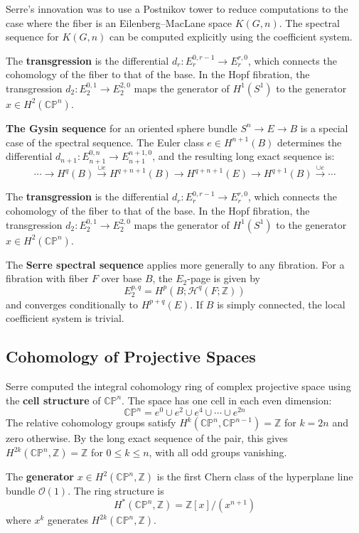 Serre's innovation was to use a Postnikov tower to reduce computations to the case where the fiber is an Eilenberg--MacLane space $K(G, n)$. The spectral sequence for $K(G, n)$ can be computed explicitly using the coefficient system.

The \textbf{transgression} is the differential $d_r: E_r^{0,r-1} \to E_r^{r,0}$, which connects the cohomology of the fiber to that of the base. In the Hopf fibration, the transgression $d_2: E_2^{0,1} \to E_2^{2,0}$ maps the generator of $H^1(S^1)$ to the generator $x \in H^2(\mathbb{CP}^n)$.

\textbf{The Gysin sequence} for an oriented sphere bundle $S^n \to E \to B$ is a special case of the spectral sequence. The Euler class $e \in H^{n+1}(B)$ determines the differential $d_{n+1}: E_{n+1}^{0,n} \to E_{n+1}^{n+1,0}$, and the resulting long exact sequence is:
\[\cdots \to H^q(B) \xrightarrow{\cup e} H^{q+n+1}(B) \to H^{q+n+1}(E) \to H^{q+1}(B) \xrightarrow{\cup e} \cdots\]

The \textbf{transgression} is the differential $d_r: E_r^{0,r-1} \to E_r^{r,0}$, which connects the cohomology of the fiber to that of the base. In the Hopf fibration, the transgression $d_2: E_2^{0,1} \to E_2^{2,0}$ maps the generator of $H^1(S^1)$ to the generator $x \in H^2(\mathbb{CP}^n)$.

The \textbf{Serre spectral sequence} applies more generally to any fibration. For a fibration with fiber $F$ over base $B$, the $E_2$-page is given by
\[E_2^{p,q} = H^p(B; \mathcal{H}^q(F; \mathbb{Z}))\]
and converges conditionally to $H^{p+q}(E)$. If $B$ is simply connected, the local coefficient system is trivial.

\subsection{Cohomology of Projective Spaces}

Serre computed the integral cohomology ring of complex projective space using the \textbf{cell structure} of $\mathbb{CP}^n$. The space has one cell in each even dimension:
\[\mathbb{CP}^n = e^0 \cup e^2 \cup e^4 \cup \cdots \cup e^{2n}\]
The relative cohomology groups satisfy $H^k(\mathbb{CP}^n, \mathbb{CP}^{n-1}) = \mathbb{Z}$ for $k = 2n$ and zero otherwise. By the long exact sequence of the pair, this gives $H^{2k}(\mathbb{CP}^n, \mathbb{Z}) = \mathbb{Z}$ for $0 \leq k \leq n$, with all odd groups vanishing.

The \textbf{generator} $x \in H^2(\mathbb{CP}^n, \mathbb{Z})$ is the first Chern class of the hyperplane line bundle $\mathcal{O}(1)$. The ring structure is
\[H^*(\mathbb{CP}^n, \mathbb{Z}) = \mathbb{Z}[x]/(x^{n+1})\]
where $x^k$ generates $H^{2k}(\mathbb{CP}^n, \mathbb{Z})$.

